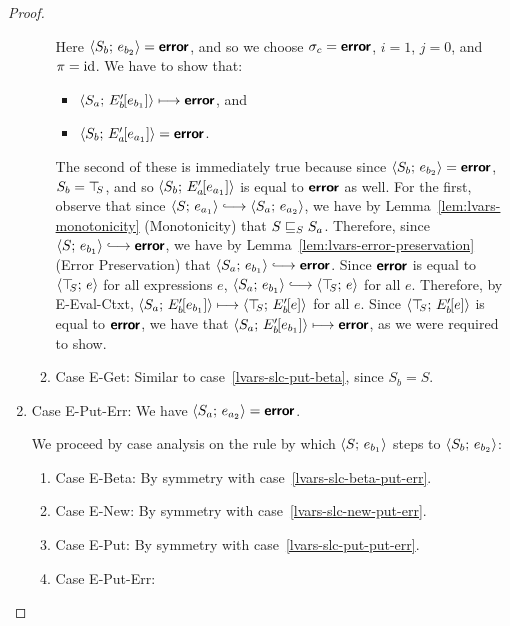 \begin{proof}
\begin{enumerate}
\begin{enumerate}
      Here $\langle S_b;\, e_{b_2} \rangle = \textbf{\textsf{error}}$, and so we choose $\sigma_c
      = \textbf{\textsf{error}}$, $i = 1$, $j = 0$, and $\pi = \mathrm{id}$.  We have to show that:
      \begin{itemize}
      \item $\langle S_a;\, E'_b\hspace{-1mm}\left[e_{b_1}\right] \rangle \longmapsto
        \textbf{\textsf{error}}$, and
      \item
        $\langle S_b;\, E'_a\hspace{-1mm}\left[e_{a_1}\right] \rangle = \textbf{\textsf{error}}$.
      \end{itemize}

      The second of these is immediately true because since
      $\langle S_b;\, e_{b_2} \rangle = \textbf{\textsf{error}}$, $S_b = \top\hspace{-0.85mm}_{S}$, and so
      $\langle S_b;\, E'_a\hspace{-1mm}\left[e_{a_1}\right] \rangle$ is equal to $\textbf{\textsf{error}}$ as
      well.  For the first, observe that since $\config{S}{e_{a_1}}
      \parstepsto \config{S_a}{e_{a_2}}$, we have by
      Lemma~\ref{lem:lvars-monotonicity} (Monotonicity) that
      $S \sqsubseteq_S S_a$.  Therefore, since $\config{S}{e_{b_1}}
      \parstepsto \error$, we have by
      Lemma~\ref{lem:lvars-error-preservation} (Error Preservation)
      that $\config{S_a}{e_{b_1}} \parstepsto \error$.  Since $\textbf{\textsf{error}}$
      is equal to $\langle \top\hspace{-0.85mm}_{S};\, e \rangle$ for all expressions $e$,
      $\config{S_a}{e_{b_1}} \parstepsto \config{\topS}{e}$ for all
      $e$.  Therefore, by {\sc E-Eval-Ctxt},
      $\langle S_a;\, E'_b\hspace{-1mm}\left[e_{b_1}\right] \rangle \longmapsto
      \langle \top\hspace{-0.85mm}_{S};\, E'_b\hspace{-1mm}\left[e\right] \rangle$ for all $e$.  Since
      $\langle \top\hspace{-0.85mm}_{S};\, E'_b\hspace{-1mm}\left[e\right] \rangle$ is equal to $\textbf{\textsf{error}}$, we
      have that $\langle S_a;\, E'_b\hspace{-1mm}\left[e_{b_1}\right] \rangle \longmapsto
      \textbf{\textsf{error}}$, as we were required to show.

    \item \label{lvars-slc-put-get}Case {\sc E-Get}: Similar to
      case~\ref{lvars-slc-put-beta}, since $S_b = S$.
    \end{enumerate}
  \item Case {\sc E-Put-Err}: We have $\langle S_a;\, e_{a_2} \rangle =
    \textbf{\textsf{error}}$.

    We proceed by case analysis on the rule by which
    $\langle S;\, e_{b_1} \rangle$ steps to $\langle S_b;\, e_{b_2} \rangle$:
    \begin{enumerate}
    \item \label{lvars-slc-put-err-beta}Case {\sc E-Beta}: By symmetry with case~\ref{lvars-slc-beta-put-err}.
    \item \label{lvars-slc-put-err-new}Case {\sc E-New}: By symmetry with case~\ref{lvars-slc-new-put-err}.
    \item \label{lvars-slc-put-err-put}Case {\sc E-Put}: By symmetry with case~\ref{lvars-slc-put-put-err}.
    \item \label{lvars-slc-put-err-put-err}Case {\sc E-Put-Err}: 


\end{enumerate}
\end{enumerate}
\end{proof}
